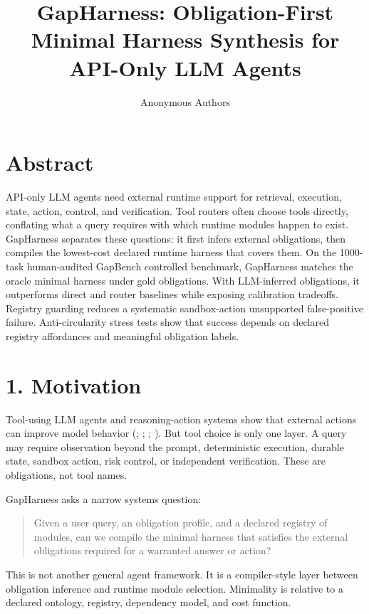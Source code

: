 \documentclass[
  10pt,
]{article}
\title{GapHarness: Obligation-First Minimal Harness Synthesis for
API-Only LLM Agents}
\author{Anonymous Authors}
\date{}
\begin{document}
\maketitle

\section{Abstract}\label{abstract}

API-only LLM agents need external runtime support for retrieval,
execution, state, action, control, and verification. Tool routers often
choose tools directly, conflating what a query requires with which
runtime modules happen to exist. GapHarness separates these questions:
it first infers external obligations, then compiles the lowest-cost
declared runtime harness that covers them. On the 1000-task
human-audited GapBench controlled benchmark, GapHarness matches the
oracle minimal harness under gold obligations. With LLM-inferred
obligations, it outperforms direct and router baselines while exposing
calibration tradeoffs. Registry guarding reduces a systematic
sandbox-action unsupported false-positive failure. Anti-circularity
stress tests show that success depends on declared registry affordances
and meaningful obligation labels.

\section{1. Motivation}\label{motivation}

Tool-using LLM agents and reasoning-action systems show that external
actions can improve model behavior (; ;
;
). But tool choice is only
one layer. A query may require observation beyond the prompt,
deterministic execution, durable state, sandbox action, risk control, or
independent verification. These are obligations, not tool names.

GapHarness asks a narrow systems question:

\begin{quote}
Given a user query, an obligation profile, and a declared registry of
modules, can we compile the minimal harness that satisfies the external
obligations required for a warranted answer or action?
\end{quote}

This is not another general agent framework. It is a compiler-style
layer between obligation inference and runtime module selection.
Minimality is relative to a declared ontology, registry, dependency
model, and cost function.
\end{document}
